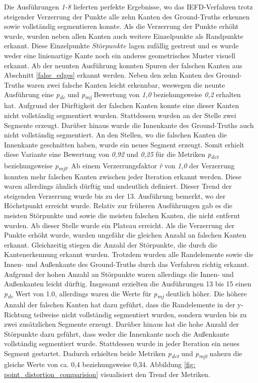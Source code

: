 Die Ausführungen \textit{1-8} lieferten perfekte Ergebnisse, wo das IEFD-Verfahren trotz steigender Verzerrung der Punkte alle zehn Kanten des Ground-Truths erkennen sowie vollständig segmentieren konnte. Als die Verzerrung der Punkte erhöht wurde, wurden neben allen Kanten auch weitere Einzelpunkte als Randpunkte erkannt. Diese Einzelpunkte \(Störpunkte\) lagen zufällig gestreut und es wurde weder eine linienartige Kante noch ein anderes geometrisches Muster visuell erkannt. Ab der neunten Ausführung konnten Spuren der falschen Kanten aus Abschnitt \ref{false_edges} erkannt werden. Neben den zehn Kanten des Ground-Truths waren zwei falsche Kanten leicht erkennbar, weswegen die neunte Ausführung eine \textit{p\textsubscript{dc}} und \textit{p\textsubscript{mj}} Bewertung von \textit{1,0} beziehungsweise \textit{0,2} erhalten hat. Aufgrund der Dürftigkeit der falschen Kanten konnte eine dieser Kanten nicht vollständig segmentiert wurden. Stattdessen wurden an der Stelle zwei Segmente erzeugt. Darüber hinaus wurde die Innenkante des Ground-Truths auch nicht vollständig segmentiert. An den Stellen, wo die falschen Kanten die Innenkante geschnitten haben, wurde ein neues Segment erzeugt. Somit erhielt diese Variante eine Bewertung von \textit{0,92} und \textit{0,25} für die Metriken \textit{p\textsubscript{dct}} beziehungsweise \textit{p\textsubscript{mjt}}. Ab einem Verzerrungsfaktor \textit{\^{r}} von \textit{1,0} der Verzerrung konnten mehr falschen Kanten zwischen jeder Iteration erkannt werden. Diese waren allerdings ähnlich dürftig und undeutlich definiert.  Dieser Trend der steigenden Verzerrung wurde bis zu der 13. Ausführung bemerkt, wo der Höchstpunkt erreicht wurde. Relativ zur früheren Ausführungen gab es die meisten Störpunkte und sowie die meisten falschen Kanten, die nicht entfernt wurden. Ab dieser Stelle wurde ein Plateau erreicht. Als die Verzerrung der Punkte erhöht wurde, wurden ungefähr die gleichen Anzahl an falschen Kanten erkannt. Gleichzeitig stiegen die Anzahl der Störpunkte, die durch die Kantenerkennung erkannt wurden. Trotzdem wurden alle Randelemente sowie die Innen- und Außenkante des Ground-Truths durch das Verfahren richtig erkannt. Aufgrund der hohen Anzahl an Störpunkte waren allerdings die Innen- und Außenkanten leicht dürftig. Insgesamt erzielten die Ausführungen 13 bis 15 einen \textit{p\textsubscript{dc}} Wert von 1.0, allerdings waren die Werte für \textit{p\textsubscript{mj}} deutlich höher. Die höhere Anzahl der falschen Kanten hat dazu geführt, dass die Randelemente in der y-Richtung teilweise nicht vollständig segmentiert wurden, sondern wurden bis zu zwei zusätzlichen Segmente erzeugt. Darüber hinaus hat die hohe Anzahl der Störpunkte dazu geführt, dass weder die Innenkante noch die Außenkante vollständig segmentiert wurde. Stattdessen wurde in jeder Iteration ein neues Segment gestartet. Dadurch erhielten beide Metriken \textit{p\textsubscript{dct}} und \textit{p\textsubscript{mjt}} nahezu die gleiche Werte von ca. 0,4 beziehungsweise 0,34. Abbildung \ref{fig: point_distortion_comparision} visualisiert den Trend der Metriken. 

